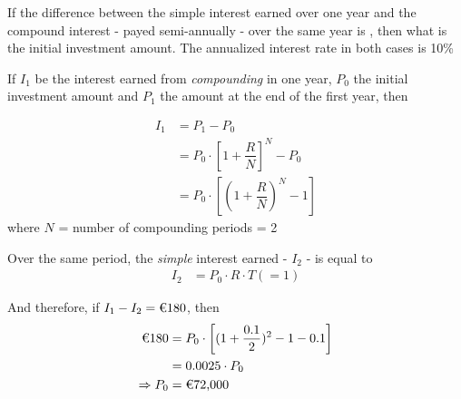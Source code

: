 

\question[3]   If the difference between the simple interest earned over one year
and the compound interest - payed semi-annually - over the same year is ,
then what is the initial investment amount. The annualized interest rate in both cases is 10\% 


\ifprintanswers
\fi 

\begin{solution}[\fullpage]
	If $I_1$ be the interest earned from \emph{compounding} in one year, $P_0$ the 
	initial investment amount and $P_1$ the amount at the end of the first year, then
	
	\begin{align}
		I_1 &= P_1 - P_0 \\ 
		    &= P_0\cdot\left[ 1+\dfrac{R}{N}\right]^N - P_0 \\
		    &= P_0\cdot\left[ (1+\dfrac{R}{N})^N - 1 \right]
	\end{align}
	where $N$ = number of compounding periods = 2
	
	Over the same period, the \emph{simple} interest earned - $I_2$ - is equal to
	\begin{align}
		I_2 &= P_0\cdot R\cdot T(=1)
    \end{align}
    
    And therefore, if $I_1-I_2 = \text{\texteuro 180}$, then 
    \begin{align}
    	\text{\texteuro 180} &= P_0\cdot\left[ (1+\dfrac{0.1}{2})^2 - 1 - 0.1\right] \\
    	                     &= 0.0025\cdot P_0 \\
    	\Rightarrow P_0 &= \text{\texteuro 72,000}
    \end{align}
\end{solution}
